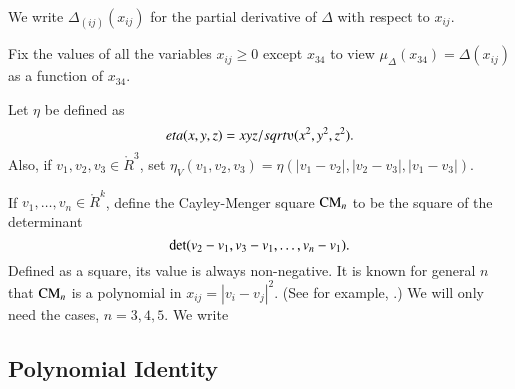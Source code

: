 \begin{tarskidata}
\begin{tarski}
We write $\Delta_{(ij)}(x_{ij})$ for the partial derivative of $\Delta$
with respect to $x_{ij}$.

Fix the values of all the variables $x_{ij}\ge 0$ except
$x_{34}$ to view $\mu_\Delta(x_{34})=\Delta(x_{ij})$ as a function of $x_{34}$.  %
\end{tarski}





\begin{tarski}

\begin{definition}
%
Let $\eta$ be defined as
	$$\eta(x,y,z) = x y z/\sqrt{\ups(x^2,y^2,z^2)}.$$
Also, if $v_1,v_2,v_3\in\ring{R}^3$, set
   $\eta_V(v_1,v_2,v_3) =\eta(|v_1-v_2|,|v_2-v_3|,|v_1-v_3|)$.
\end{definition}
\end{tarski}

\begin{tarski}

\begin{definition}
If $v_1,\ldots,v_n\in\ring{R}^k$, define
the Cayley-Menger square ${\operatorname{CM}}_n$
to be the square
of the determinant
	$${\operatorname{det}}(v_2-v_1,v_3-v_1,\ldots,v_n-v_1).$$
Defined as a square, its value is always non-negative.
It is known for general $n$ that ${\operatorname{CM}}_n$ is a polynomial in
$x_{ij} = |v_i-v_j|^2$.  (See for example,
\cite{EZ}.)
We will only need the cases, $n=3,4,5$.   We write
\end{definition}
\end{tarski}


\begin{tarski}
\section{Polynomial Identity}



\end{tarski}
\end{tarskidata}
